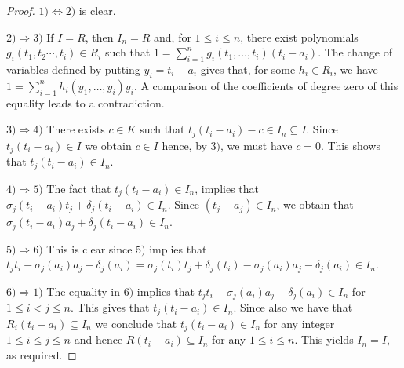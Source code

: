 \documentclass{amsproc}
\newcommand{\de}{\delta}
\newcommand{\si}{\sigma}
\numberwithin{equation}{section}
\begin{document}
\begin{proof}
	\noindent $1) \Leftrightarrow 2)$ is clear.
	
	\noindent $2) \Rightarrow 3)$ If $I=R$, then $I_n=R$ and, for $1\le i \le n$, there
	exist polynomials $g_i(t_1,t_2\cdots,t_i)\in R_i$ such that
	$1=\sum_{i=1}^ng_i(t_1,\dots ,t_i)(t_i-a_i)$.  The change of variables defined by putting $y_i=t_i-a_i$ gives that, for some $h_i\in R_i$, we have $1=\sum_{i=1}^nh_i(y_1,\dots ,y_i)y_i$.  A comparison of the coefficients of degree zero of this equality leads to a contradiction. 
	
	\noindent $3) \Rightarrow 4)$ There exists $c\in K$ such that
	$t_j(t_i-a_i)-c\in I_n\subseteq I$.  Since $t_j(t_i-a_i)\in I$ we
	obtain $c\in I$ hence, by $3)$, we must have $c=0$.  This shows
	that $t_j(t_i-a_i)\in I_n$.
	
	\noindent $4) \Rightarrow 5)$ The fact that $t_j(t_i-a_i)\in I_n$,
	implies that $\si_j(t_i-a_i)t_j+\de_j(t_i-a_i)\in I_n$.  Since
	$(t_j-a_j)\in I_n$, we obtain that
	$\si_j(t_i-a_i)a_j+\de_j(t_i-a_i)\in I_n$.
	
	\noindent $5) \Rightarrow 6)$ This is clear since $5)$ implies
	that
	$t_jt_i-\si_j(a_i)a_j-\de_j(a_i)=\si_j(t_i)t_j+\de_j(t_i)-\si_j(a_i)a_j-\de_j(a_i)\in
	I_n$.
	
	\noindent $6) \Rightarrow 1)$ The equality in $6)$ implies that
	$t_jt_i-\si_j(a_i)a_j-\de_j(a_i)\in I_n$ for $1\le i < j\le n$. This gives that $t_j(t_i-a_i)\in I_n$.  Since also we have that $R_i(t_i-a_i)\subseteq I_n$ we conclude that $t_j(t_i-a_i)\in I_n$
	for any integer $1\le i \le j \le n$ and hence $R(t_i-a_i)\subseteq I_n$ for any $1\le i \le n$.  This yields $I_n=I$, as required.
\end{proof}
\end{document}
